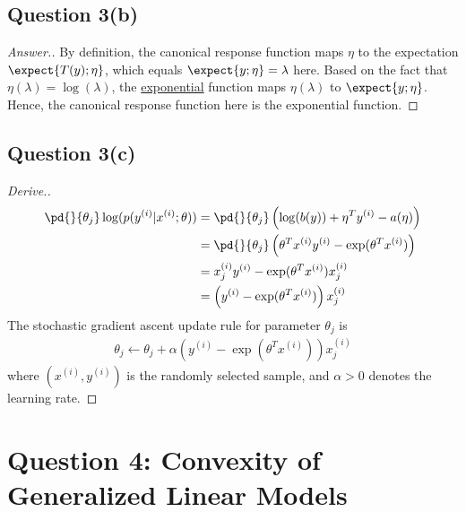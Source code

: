 \documentclass[11pt]{article}
\newcommand{\upi}[0]{^{(i)}}
\begin{document}
	\subsection{Question 3(b)}
	\begin{proof}[Answer.]
	\par By definition, the canonical response function maps $\eta$ to the expectation $\expect{T(y); \eta}$, which equals $\expect{y; \eta} = \lambda$ here. Based on the fact that $\eta(\lambda) = \log(\lambda)$, the \ul{exponential} function maps $\eta(\lambda)$ to $\expect{y; \eta}$. Hence, the canonical response function here is the exponential function.
	\end{proof}
	
	\subsection{Question 3(c)}
	\begin{proof}[Derive.]
	\begin{align}
		\pd{}{\theta_j} \log (p(y\upi|x\upi; \theta)) &= \pd{}{\theta_j} 
		\left (\log(b(y)) + \eta^T y\upi - a(\eta) \right )\\
		&= \pd{}{\theta_j} \left (
		\theta^T x\upi y\upi - \exp(\theta^T x\upi)
		\right ) \\
		&= x\upi_j y\upi - \exp(\theta^T x\upi) x\upi_j \\
		&= \left(y\upi - \exp(\theta^T x\upi )\right) x\upi_j
	\end{align}
	The stochastic gradient ascent update rule for parameter $\theta_j$ is 
	\begin{align}
		\theta_j \leftarrow \theta_j + \alpha \left(y\upi - \exp(\theta^T x\upi )\right) x\upi_j
	\end{align}
	where $(x\upi, y\upi)$ is the randomly selected sample, and $\alpha > 0$ denotes the learning rate.
	\end{proof}
	
	\newpage
	\section{Question 4: Convexity of Generalized Linear Models}
\end{document}
